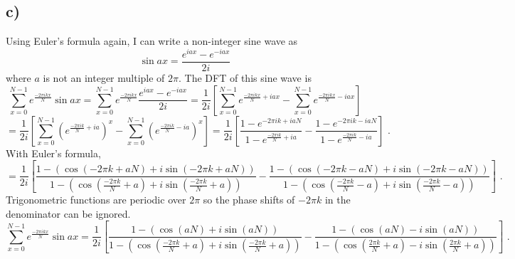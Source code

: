 \documentclass{article}
\newcommand{\<}[1]{\left\langle #1 \right\rangle }
\begin{document}
\subsection{c)}
Using Euler's formula again, I can write a non-integer sine wave as 
\[\sin{ax} = \frac{e^{iax} - e^{-iax}}{2i}\]
where $a$ is not an integer multiple of $2\pi$. The DFT of this sine wave is 
\[ \sum_{x=0}^{N-1} e^{\frac{-2\pi i k x}{N}} \sin{ax} = \sum_{x=0}^{N-1} e^{\frac{-2\pi i k x}{N}} \frac{e^{iax} - e^{-iax}}{2i} = \frac{1}{2i}\left[\sum_{x=0}^{N-1} e^{\frac{-2\pi i k x}{N} + iax} - \sum_{x=0}^{N-1} e^{\frac{-2\pi i k x}{N} - iax}\right] \]
\[ = \frac{1}{2i}\left[ \sum_{x=0}^{N-1} \left(e^{\frac{-2\pi i k }{N} + ia}\right)^x - \sum_{x=0}^{N-1} \left(e^{\frac{-2\pi i k}{N} - ia}\right)^x \right] = \frac{1}{2i}\left[ \frac{1 - e^{-2\pi i k + iaN}}{1 - e^{\frac{-2\pi i k}{N} + ia}} - \frac{1 - e^{-2\pi i k - iaN}}{1 - e^{\frac{-2\pi i k}{N} - ia}} \right] \text{ .}\]
With Euler's formula, 
\[ = \frac{1}{2i}\left[ \frac{1 - (\cos(-2\pi k + aN) + i\sin(-2\pi k + aN) )}{1 - \left(\cos\left(\frac{-2\pi k}{N} + a\right) + i\sin\left(\frac{-2\pi k}{N} + a\right)\right)} - \frac{1 - (\cos(-2\pi k - aN) + i\sin(-2\pi k - aN) )}{1 - \left(\cos\left(\frac{-2\pi k}{N} - a\right) + i\sin\left(\frac{-2\pi k}{N} - a\right)\right)} \right] \text{ .} \]
Trigonometric functions are periodic over $2\pi$ so the phase shifts of $-2\pi k$ in the denominator can be ignored.
\[ \sum_{x=0}^{N-1} e^{\frac{-2\pi i k x}{N}} \sin{ax} = \frac{1}{2i}\left[ \frac{1 - (\cos(aN) + i\sin(aN))}{1 - \left(\cos\left(\frac{-2\pi k}{N} + a\right) + i\sin\left(\frac{-2\pi k}{N} + a\right)\right)} - \frac{1 - (\cos(aN) - i\sin(aN) )}{1 - \left(\cos\left(\frac{2\pi k}{N} + a\right) - i\sin\left(\frac{2\pi k}{N} + a\right)\right)} \right] \text{ .} \]






	
\end{document}
